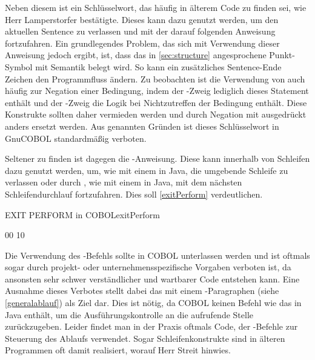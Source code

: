 Neben diesem ist  ein Schlüsselwort, das häufig in älterem Code zu finden sei, wie Herr Lamperstorfer bestätigte. Dieses kann dazu genutzt werden, um den aktuellen Sentence zu verlassen und mit der darauf folgenden Anweisung fortzufahren. Ein grundlegendes Problem, das sich mit Verwendung dieser Anweisung jedoch ergibt, ist, dass das in \autoref{sec:structure} angesprochene Punkt-Symbol mit Semantik belegt wird. So kann ein zusätzliches Sentence-Ende Zeichen den Programmfluss ändern. Zu beobachten ist die Verwendung von  auch häufig zur Negation einer Bedingung, indem der -Zweig lediglich dieses Statement enthält und der -Zweig die Logik bei Nichtzutreffen der Bedingung enthält. Diese Konstrukte sollten daher vermieden werden und durch Negation mit  ausgedrückt \bzw anders ersetzt werden. Aus genannten Gründen ist dieses Schlüsselwort in GnuCOBOL standardmäßig verboten.

Seltener zu finden ist dagegen die -Anweisung. Diese kann innerhalb von Schleifen dazu genutzt werden, um, wie mit einem  in Java, die umgebende Schleife zu verlassen oder durch , wie mit einem  in Java, mit dem nächsten Schleifendurchlauf fortzufahren. Dies soll \autoref{exitPerform} verdeutlichen.

\begin{codeWithCaption}{EXIT PERFORM in COBOL}{exitPerform}
\begin{shellwindow}
00
10
\end{shellwindow}
\end{codeWithCaption}

Die Verwendung des -Befehls sollte in COBOL unterlassen werden und ist oftmals sogar durch projekt- oder unternehmensspezifische Vorgaben verboten ist, da ansonsten sehr schwer verständlicher und wartbarer Code entstehen kann. Eine Ausnahme dieses Verbotes stellt dabei das  mit einem -Paragraphen (siehe \autoref{generalablauf}) als Ziel dar. Dies ist nötig, da COBOL keinen Befehl wie das  in Java enthält, um die Ausführungskontrolle an die aufrufende Stelle zurückzugeben. Leider findet man in der Praxis oftmals Code, der -Befehle zur Steuerung des Ablaufs verwendet. Sogar Schleifenkonstrukte sind in älteren Programmen oft damit realisiert, worauf Herr Streit hinwies. 